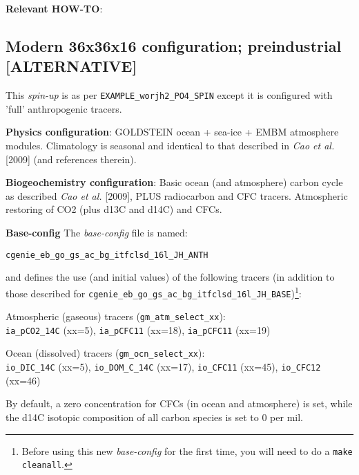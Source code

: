 \documentclass[10pt,twoside]{article}
\begin{document}
\noindent \textbf{Relevant HOW-TO}: 



\subsection{Modern 36x36x16 configuration; preindustrial [ALTERNATIVE]}\label{EXAMPLE_worjh2_PO4_PREINDUST}

This \textit{spin-up} is as per \texttt{EXAMPLE\_worjh2\_PO4\_SPIN} except it is configured with 'full' anthropogenic tracers.

\noindent \textbf{Physics configuration}: GOLDSTEIN ocean + sea-ice + EMBM atmosphere modules. Climatology is seasonal and identical to that described in \textit{Cao et al.} [2009] (and references therein).

\noindent \textbf{Biogeochemistry configuration}: Basic ocean (and atmosphere) carbon cycle as described \textit{Cao et al.} [2009], PLUS radiocarbon and CFC tracers. Atmospheric restoring of CO2 (plus d13C and d14C) and CFCs.

\noindent \textbf{Base-config} The \textit{base-config} file is named:
\vspace{-10pt}\begin{verbatim}cgenie_eb_go_gs_ac_bg_itfclsd_16l_JH_ANTH\end{verbatim}\vspace{-10pt}
and defines the use (and initial values) of the following tracers (in addition to those described for \texttt{cgenie\_eb\_go\_gs\_ac\_bg\_itfclsd\_16l\_JH\_BASE})\footnote{Before using this new \textit{base-config} for the first time, you will need to do a \texttt{make cleanall}.}:
\begin{compactenum}
	
	\item Atmospheric (gaseous) tracers (\texttt{gm\_atm\_select\_xx}):
	\\\texttt{ia\_pCO2\_14C} (xx=5), \texttt{ia\_pCFC11} (xx=18), \texttt{ia\_pCFC11} (xx=19)
	\item Ocean (dissolved) tracers (\texttt{gm\_ocn\_select\_xx}):
	\\\texttt{io\_DIC\_14C} (xx=5), \texttt{io\_DOM\_C\_14C} (xx=17), \texttt{io\_CFC11} (xx=45), \texttt{io\_CFC12} (xx=46)
		
\end{compactenum}
By default, a zero concentration for CFCs (in ocean and atmosphere) is set, while the d14C isotopic composition of all carbon species is set to 0 per mil.
\end{document}
